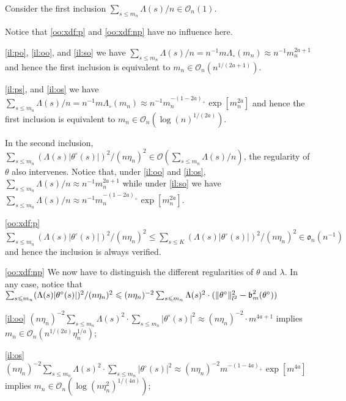 \begin{il}
Consider the first inclusion $\sum\nolimits_{s \leq m_{n}} \Lambda(s)/n \in \mathcal{O}_{n}(1)$.

Notice that \ref{oo:xdf:p} and \ref{oo:xdf:np} have no influence here.
\begin{Liste}[]
\item[\ref{il:po}, \ref{il:oo}, and \ref{il:so}] we have $\sum\nolimits_{s \leq m_{n}} \Lambda(s)/n = n^{-1} m \Lambda_{\circ}(m_{n}) \approx n^{-1} m_{n}^{2 a + 1}$ and hence the first inclusion is equivalent to $m_{n} \in \mathcal{O}_{n}(n^{1/(2 a + 1)})$.
\item[\ref{il:ps}, and \ref{il:os}] we have $\sum\nolimits_{s \leq m_{n}} \Lambda(s)/n = n^{-1} m \Lambda_{\circ}(m_{n}) \approx n^{-1} m_{n}^{-(1 -2a)_{+}} \exp[m_{n}^{2a}]$ and hence the first inclusion is equivalent to $m_{n} \in \mathcal{O}_{n}(\log(n)^{1/(2 a)})$.
\end{Liste}
In the second inclusion, $\sum\nolimits_{s \leq m_{n}} (\Lambda(s) \vert\theta^{\circ}(s)\vert)^{2}/(n \eta_{n})^{2} \in \mathcal{O}\left(\sum\nolimits_{ s \leq m_{n}} \Lambda(s)/n\right)$, the regularity of $\theta$ also intervenes.
Notice that, under \ref{il:oo} and \ref{il:os}, $\sum\nolimits_{s \leq m_{n}} \Lambda(s)/n \approx n^{-1} m_{n}^{2 a + 1}$ while under \ref{il:so} we have $\sum\nolimits_{s \leq m_{n}} \Lambda(s)/n \approx n^{-1} m_{n}^{-(1 -2a)_{+}} \exp[m_{n}^{2a}]$.
\begin{Liste}[]
\item[\ref{oo:xdf:p}] $\sum\nolimits_{s \leq m_{n}} (\Lambda(s) \vert\theta^{\circ}(s)\vert)^{2}/(n \eta_{n})^{2} \leq \sum\nolimits_{s \leq K} (\Lambda(s) \vert\theta^{\circ}(s)\vert)^{2}/(n \eta_{n})^{2} \in \mathfrak{o}_{n}(n^{-1})$ and hence the inclusion is always verified.
\item[\ref{oo:xdf:np}] We now have to distinguish the different regularities of $\theta$ and $\lambda$.
In any case, notice that $\sum\nolimits_{s \leqslant m_{n}} (\Lambda(s) \vert\theta^{\circ}(s)\vert)^{2}/(n \eta_{n})^{2} \leqslant (n \eta_{n})^{-2} \sum\nolimits_{s \leqslant m_{n}} \Lambda(s)^{2} \cdot (\Vert \theta^{\circ} \Vert_{l^{2}}^{2} - \operatorname{\mathfrak{b}}_{m}^{2}(\theta^{\circ}))$
\begin{Liste}[]
\item[\ref{il:oo}] $(n \eta_{n})^{-2} \sum\limits_{s \leq m_{n}} \Lambda(s)^{2} \cdot \sum\limits_{s \leq m_{n}} \vert\theta^{\circ}(s)\vert^{2} \approx (n \eta_{n})^{-2} \cdot m^{4a + 1}$ implies $m_{n} \in \mathcal{O}_{n}(n^{1/(2a)} \eta_{n}^{1/a})$;
\item[\ref{il:os}] $(n \eta_{n})^{-2} \sum\limits_{s \leq m_{n}} \Lambda(s)^{2} \cdot \sum\limits_{s \leq m_{n}} \vert\theta^{\circ}(s)\vert^{2} \approx (n \eta_{n})^{-2} m^{-(1 - 4a)_{+}} \exp[m^{4 a}]$ implies $m_{n} \in \mathcal{O}_{n}(\log(n \eta_{n}^{2})^{1/(4a)})$;

\end{Liste}
\end{Liste}
\end{il}
